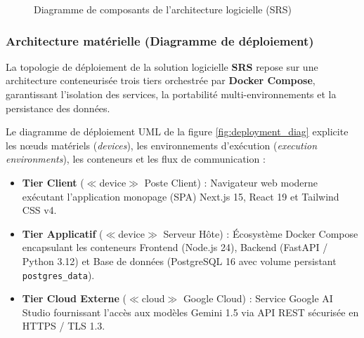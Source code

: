 \begin{figure}[H]
\caption{Diagramme de composants de l'architecture logicielle (SRS)}
\label{fig:component_diag}
\end{figure}

\clearpage
\subsubsection{Architecture matérielle (Diagramme de déploiement)}

La topologie de déploiement de la solution logicielle \textbf{SRS} repose sur une architecture conteneurisée trois tiers orchestrée par \textbf{Docker Compose}, garantissant l'isolation des services, la portabilité multi-environnements et la persistance des données. 

Le diagramme de déploiement UML de la figure \ref{fig:deployment_diag} explicite les n{\oe}uds matériels (\textit{devices}), les environnements d'exécution (\textit{execution environments}), les conteneurs et les flux de communication :

\begin{itemize}[leftmargin=1.0cm, label=\textcolor{focpgreen}{$\bullet$}]
    \item \textbf{Tier Client} ($\ll$device$\gg$ Poste Client) : Navigateur web moderne exécutant l'application monopage (SPA) Next.js 15, React 19 et Tailwind CSS v4.
    \item \textbf{Tier Applicatif} ($\ll$device$\gg$ Serveur Hôte) : Écosystème Docker Compose encapsulant les conteneurs Frontend (Node.js 24), Backend (FastAPI / Python 3.12) et Base de données (PostgreSQL 16 avec volume persistant \texttt{postgres\_data}).
    \item \textbf{Tier Cloud Externe} ($\ll$cloud$\gg$ Google Cloud) : Service Google AI Studio fournissant l'accès aux modèles Gemini 1.5 via API REST sécurisée en HTTPS / TLS 1.3.
\end{itemize}

\vspace{0.2cm}


